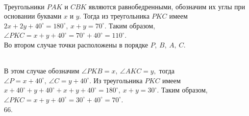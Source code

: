 \documentclass[12pt]{article}
\begin{document}
\begin{figure}[ht!]
\end{figure}\\
Треугольники $PAK$ и $CBK$ являются равнобедренными, обозначим их углы при основании буквами $x$ и $y.$ Тогда из треугольника $PKC$ имеем $2x+2y+40^\circ=180^\circ,\ x+y=70^\circ.$ Таким образом, $\angle PKC=x+y+40^\circ=70^\circ+40^\circ=110^\circ.$\\
Во втором случае точки расположены в порядке $P,\ B,\ A,\ C.$
\begin{figure}[ht!]
\end{figure}\\
В этом случае обозначим $\angle PKB=x,\ \angle AKC=y,$ тогда $\angle P=x+40^\circ,\ \angle C=y+40^\circ.$ Из треугольника $PKC$ имеем $x+40^\circ+y+40^\circ+x+y+40^\circ=180^\circ,\ x+y=30^\circ.$ Таким образом, $\angle PKC=x+y+40^\circ=30^\circ+40^\circ=70^\circ.$\\
66. \begin{figure}[ht!]
\end{figure}\\
\end{document}
